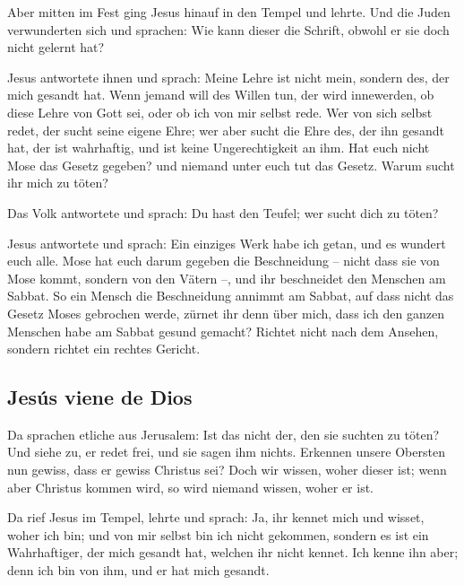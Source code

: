  Aber mitten im Fest ging Jesus hinauf in den Tempel und
lehrte.  Und die Juden verwunderten sich und sprachen:
Wie kann dieser die Schrift, obwohl er sie doch nicht gelernt hat?

 Jesus antwortete ihnen und sprach: Meine Lehre ist nicht
mein, sondern des, der mich gesandt hat.  Wenn jemand
will des Willen tun, der wird innewerden, ob diese Lehre von Gott sei,
oder ob ich von mir selbst rede.  Wer von sich selbst
redet, der sucht seine eigene Ehre; wer aber sucht die Ehre des, der ihn
gesandt hat, der ist wahrhaftig, und ist keine Ungerechtigkeit an ihm.
 Hat euch nicht Mose das Gesetz gegeben? und niemand
unter euch tut das Gesetz. Warum sucht ihr mich zu töten?

 Das Volk antwortete und sprach: Du hast den Teufel; wer
sucht dich zu töten?

 Jesus antwortete und sprach: Ein einziges Werk habe ich
getan, und es wundert euch alle.  Mose hat euch darum
gegeben die Beschneidung -- nicht dass sie von Mose kommt, sondern von
den Vätern --, und ihr beschneidet den Menschen am Sabbat.
 So ein Mensch die Beschneidung annimmt am Sabbat, auf
dass nicht das Gesetz Moses gebrochen werde, zürnet ihr denn über mich,
dass ich den ganzen Menschen habe am Sabbat gesund gemacht?
 Richtet nicht nach dem Ansehen, sondern richtet ein
rechtes Gericht.

\hypertarget{jesuxfas-viene-de-dios}{%
\subsection{Jesús viene de Dios}\label{jesuxfas-viene-de-dios}}

 Da sprachen etliche aus Jerusalem: Ist das nicht der,
den sie suchten zu töten?  Und siehe zu, er redet frei,
und sie sagen ihm nichts. Erkennen unsere Obersten nun gewiss, dass er
gewiss Christus sei?  Doch wir wissen, woher dieser ist;
wenn aber Christus kommen wird, so wird niemand wissen, woher er ist.

 Da rief Jesus im Tempel, lehrte und sprach: Ja, ihr
kennet mich und wisset, woher ich bin; und von mir selbst bin ich nicht
gekommen, sondern es ist ein Wahrhaftiger, der mich gesandt hat, welchen
ihr nicht kennet.  Ich kenne ihn aber; denn ich bin von
ihm, und er hat mich gesandt.

